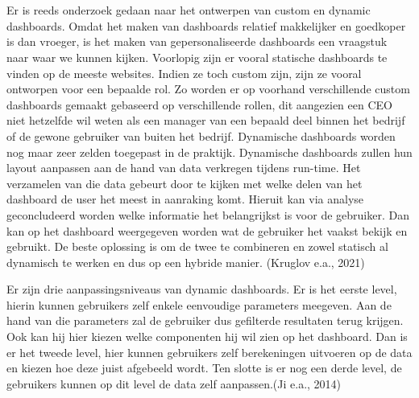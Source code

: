 \section{}%
\label{sec:huidigeStaatDashboards}
Er is reeds onderzoek gedaan naar het ontwerpen van custom en dynamic dashboards. Omdat het maken van dashboards relatief makkelijker en goedkoper is dan vroeger, is het maken van gepersonaliseerde dashboards een vraagstuk naar waar we kunnen kijken. Voorlopig zijn er vooral statische dashboards te vinden op de meeste websites. Indien ze toch custom zijn, zijn ze vooral ontworpen voor een bepaalde rol. Zo worden er op voorhand verschillende custom dashboards gemaakt gebaseerd op verschillende rollen, dit aangezien een CEO niet hetzelfde wil weten als een manager van een bepaald deel binnen het bedrijf of de gewone gebruiker van buiten het bedrijf. Dynamische dashboards worden nog maar
zeer zelden toegepast in de praktijk. Dynamische dashboards zullen hun layout aanpassen aan de hand van data verkregen tijdens run-time. Het verzamelen van die data gebeurt door te kijken met welke delen van het dashboard de user het meest in aanraking komt. Hieruit kan via analyse geconcludeerd worden welke informatie het belangrijkst is voor de gebruiker. Dan kan op het dashboard weergegeven worden wat de gebruiker het vaakst bekijk en gebruikt. De beste oplossing is om de twee te combineren en zowel statisch al dynamisch te werken en dus op een hybride manier. (Kruglov e.a., 2021)

Er zijn drie aanpassingsniveaus van dynamic dashboards. Er is het eerste level, hierin kunnen gebruikers zelf enkele eenvoudige parameters meegeven. Aan de hand van die parameters zal de gebruiker dus gefilterde resultaten terug krijgen. Ook kan hij hier kiezen welke componenten hij wil zien op het dashboard. Dan is er het tweede level, hier kunnen gebruikers zelf berekeningen uitvoeren op de data en kiezen hoe deze juist afgebeeld wordt. Ten slotte is er nog een
derde level, de gebruikers kunnen op dit level de data zelf aanpassen.(Ji e.a., 2014)

